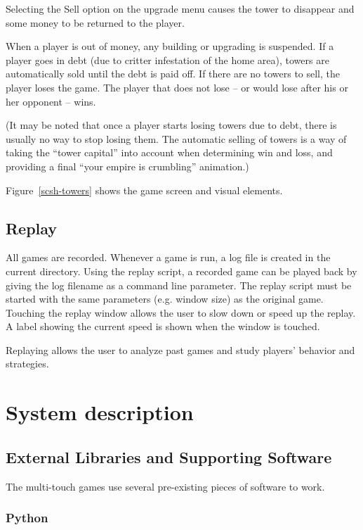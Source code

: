 \documentclass[a4paper,11pt]{article}
\begin{document}
Selecting the Sell option on the upgrade menu causes the tower to disappear
and some money to be returned to the player.

When a player is out of money, any building or upgrading is suspended.
If a player goes in debt (due to critter infestation of the home area), towers
are automatically sold until the debt is paid off.
If there are no towers to sell, the player loses the game.
The player that does not lose – or would lose after his or her opponent – wins.

(It may be noted that once a player starts losing towers due to debt, there is
usually no way to stop losing them.
The automatic selling of towers is a way of taking the “tower capital” into
account when determining win and loss, and providing a final “your empire is
crumbling” animation.)

Figure~\ref{scsh-towers} shows the game screen and visual elements.

\subsection{Replay}

All games are recorded. Whenever a game is run, a log file is created in the
current directory.
Using the replay script, a recorded game can be played back by giving the log
filename as a command line parameter.
The replay script must be started with the same parameters (e.g. window
size) as the original game.
Touching the replay window allows the user to slow down or speed up the replay.
A label showing the current speed is shown when the window is touched.

Replaying allows the user to analyze past games and study players' behavior and
strategies.

\section{System description}

\subsection{External Libraries and Supporting Software}
\label{dependencies}

The multi-touch games use several pre-existing pieces of software to work.

\subsubsection{Python}
\end{document}
